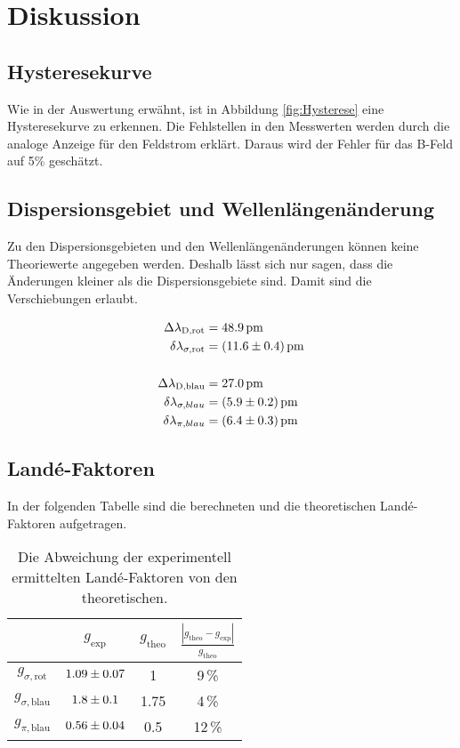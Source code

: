 \section{Diskussion}
\label{sec:Diskussion}
\subsection{Hysteresekurve}
Wie in der Auswertung erwähnt, ist in Abbildung \eqref{fig:Hysterese} eine Hysteresekurve zu erkennen. Die Fehlstellen in den Messwerten werden durch die analoge Anzeige für den Feldstrom erklärt. Daraus wird der Fehler für das B-Feld auf 5\% geschätzt.



\subsection{Dispersionsgebiet und Wellenlängenänderung}
Zu den Dispersionsgebieten und den Wellenlängenänderungen können keine Theoriewerte angegeben werden. Deshalb lässt sich nur sagen, dass die Änderungen kleiner als die Dispersionsgebiete sind. Damit sind die Verschiebungen erlaubt.

\begin{align*}
  \Delta\lambda_\text{D,rot} &= 48.9\,\text{pm} \\
  \delta \lambda_{\sigma,\text{rot}} &= (\num{11.6 +- 0.4})\,\text{pm} \\
  \\
  \Delta\lambda_\text{D,blau} &= 27.0\,\text{pm} \\
  \delta \lambda_{\sigma,blau} &= (\num{5.9 +- 0.2})\,\text{pm} \\
  \delta \lambda_{\pi,blau} &= (\num{6.4 +- 0.3})\,\text{pm}
\end{align*}



\subsection{Landé-Faktoren}
In der folgenden Tabelle sind die berechneten und die theoretischen Landé-Faktoren aufgetragen.

\begin{table}[H]
   \centering
   \caption{Die Abweichung der experimentell ermittelten Landé-Faktoren von den theoretischen.}
   \label{tab:}
   \begin{tabular}{c|c|c|c}
     & $g_\text{exp}$ & $g_\text{theo}$ & $\frac{|g_\text{theo} - g_\text{exp}|}{g_\text{theo}}$ \\
     \hline
     $g_{\sigma,\text{rot}}$  & $\num{1.09 +- 0.07}$ & 1 & 9\,\% \\
     $g_{\sigma,\text{blau}}$ & $\num{1.8 +- 0.1}$   & 1.75 & 4\,\% \\
     $g_{\pi,\text{blau}}$    & $\num{0.56 +- 0.04}$ & 0.5 & 12\,\% \\
   \end{tabular}
\end{table}


